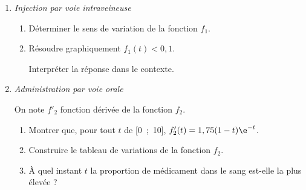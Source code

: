 \begin{enumerate}
\item \emph{Injection par voie intraveineuse}
	\begin{enumerate}
		\item Déterminer le sens de variation de la fonction $f_1$.
		\item Résoudre graphiquement $f_1(t) < 0,1$. 
		
Interpréter la réponse dans le contexte.
	\end{enumerate}
\item \emph{Administration par voie orale}

On note $f'_2$ fonction dérivée de la fonction $f_2$.

\medskip

	\begin{enumerate}
		\item Montrer que, pour tout $t$ de [0~;~10], $f'_2(t) = 1,75(1- t)\e^{-t}$.
		\item Construire le tableau de variations de la fonction $f_2$.
		\item À quel instant $t$ la proportion de médicament dans le sang est-elle la plus élevée ?
	\end{enumerate}
\end{enumerate}

\medskip
